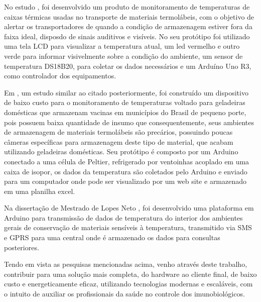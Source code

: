 No estudo \cite{lima2019controle}, foi desenvolvido um produto de monitoramento de temperaturas de caixas térmicas usadas no transporte de materiais termolábeis, com o  objetivo de alertar os transportadores de quando a condição de armazenagem estiver fora da faixa ideal, disposdo de sinais auditivos e visíveis. No seu protótipo foi utilizado uma tela LCD para visualizar a temperatura atual, um led vermelho e outro verde para informar visivelmente sobre a condição do ambiente, um sensor de temperatura DS18B20, para coletar os dados necessários e um Arduíno Uno R3, como controlador dos equipamentos.

Em \cite{kersbaum2019monitoramento}, um estudo similar ao citado posteriormente, foi construído um dispositivo de baixo custo para o monitoramento de temperaturas voltado para geladeiras domésticas que armazenam vacinas em municípios do Brasil de pequeno porte, pois possuem baixa quantidade de insumo que consequentemente, seus ambientes de armazenagem de materiais termolábeis são precários, possuindo poucas câmeras específicas para armazenagem deste tipo de material, que acabam utilizando geladeiras domésticas. Seu protótipo é composto por um Arduino conectado a uma célula de Peltier, refrigerado por ventoinhas acoplado em uma caixa de isopor, os dados da temperatura são coletados pelo Arduino e enviado para um computador onde pode ser visualizado por um web site e armazenado em uma planilha excel.

Na dissertação de Mestrado de Lopes Neto \cite{lopes2019monitoramento}, foi desenvolvido uma plataforma em Arduino para transmissão de dados de temperatura do interior dos ambientes gerais de conservação de materiais sensíveis à temperatura, transmitido via SMS e GPRS para uma central onde é armazenado os dados para consultas posteriores.

Tendo em vista as pesquisas mencionadas acima, venho através deste trabalho, contribuir para uma solução mais completa, do hardware ao cliente final, de baixo custo e energeticamente eficaz, utilizando tecnologias modernas e escaláveis, com o intuito de auxiliar os profissionais da saúde no controle dos imunobiológicos.






